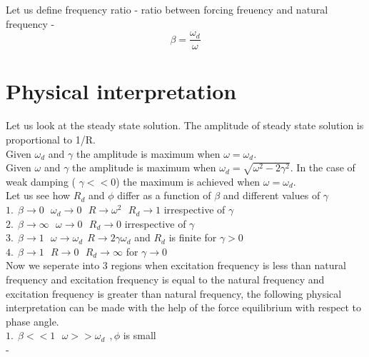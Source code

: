 \documentclass{book}
\begin{document}
\noindent
Let us define frequency ratio - ratio between forcing freuency and natural frequency - 
\[ \beta = \frac{\omega_d}{\omega} \]

\section{Physical interpretation }
Let us look at the steady state solution.
The amplitude of steady state solution is proportional to 1/R.\\


\noindent
Given \( \omega_d\) and \(\gamma\) the amplitude is maximum when \( \omega = \omega_d\).\\

\noindent
Given \( \omega\) and \(\gamma\) the amplitude is maximum when \( \omega_d = \sqrt{\omega^2  - 2 \gamma^2 }\).
In the case of weak damping ( \(\gamma << 0\)) the maximum is achieved when \(\omega = \omega_d\). \\

Let us see how \(R_d\) and \(\phi\) differ as a function of \(\beta\) and different values of \(\gamma\)\\

\noindent
\( 1.\ \ \beta \rightarrow 0 \ \ \ \omega_d \rightarrow 0 \ \ \ R \rightarrow \omega^2 \ \ \ R_d \rightarrow 1 \) irrespective of \(\gamma \)\\

\noindent
\( 2. \ \ \beta \rightarrow \infty \ \ \  \omega \rightarrow 0 \ \ \ R_d \rightarrow 0\) irrespective of \(\gamma \)\\

\noindent
\( 3. \ \ \beta \rightarrow 1 \ \ \  \omega \rightarrow \omega_d \ \  R \rightarrow 2 \gamma \omega_d \) and \(R_d\) is finite for \(\gamma > 0\)\\

\noindent
\(4. \ \  \beta \rightarrow 1 \ \ \ R \rightarrow 0 \ \ \ R_d \rightarrow \infty \) for \(\gamma \rightarrow 0\) \\

\noindent
Now we seperate into 3 regions when excitation frequency is less than natural 
frequency and excitation frequency is equal to the natural frequency and excitation frequency is 
greater than natural frequency, the following physical interpretation can be made with the help of 
the force equilibrium with respect to phase angle.\\

\( 1.\ \ \beta << 1 \ \ \ \omega >> \omega_d \ \ , \phi \) is small \\ - 
\end{document}
